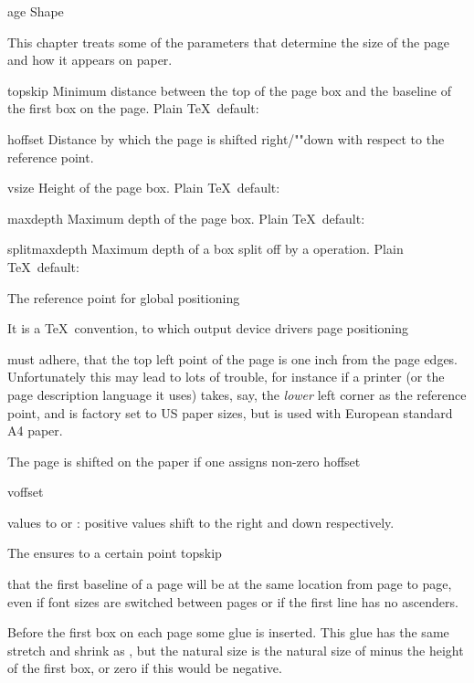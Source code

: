 \subject[page:shape]  Page Shape

This chapter treats some of the parameters that 
determine the size of the page and how it appears on paper.

\invent
\item topskip 
      Minimum distance between the top of the page box
      and the baseline of the first box on the page. 
      Plain \TeX\ default:~\n{10pt}

\item hoffset 
      Distance by which the page is shifted right/""down 
      with respect to the reference point.

\item vsize 
      Height of the page box.
      Plain \TeX\ default:~\n{8.9in}

\item maxdepth 
      Maximum depth of the page box.
      Plain \TeX\ default:~\n{4pt}

\item splitmaxdepth 
      Maximum depth of a box split off by a  operation. 
      Plain \TeX\ default:~

\inventstop

\point The reference point for global positioning

It is a \TeX\ convention, to which output device drivers
\term page positioning\par
must adhere, that the top left point of the page is
one inch from the page edges. Unfortunately this
may lead to lots of trouble, for instance if a printer
(or the page description language it uses)
takes, say, the {\em lower\/} left corner as the
reference point, and is factory set to US paper sizes,
but is used with European standard A4 paper.

The page is shifted on the paper if one assigns non-zero
\csterm hoffset\par\csterm voffset\par
values to  or : positive values
shift to the right and down respectively.

\point \cs{\topskip}

The  ensures to a certain point
\csterm topskip\par
that the first baseline of a page
will be at the same location from page to page,
even if font sizes
are switched between pages or if the first line has
no ascenders.

Before the first box on each page some glue is inserted.
This glue has the same stretch and shrink as , but
the natural size is the natural size of 
minus the height of the first box, or zero if this
would be negative.

